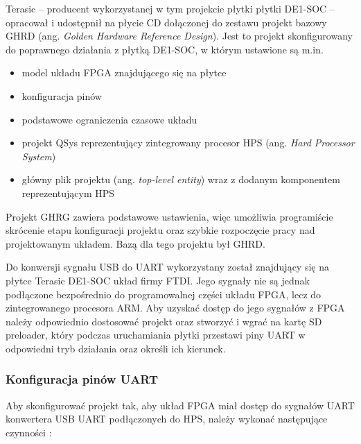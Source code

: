 Terasic -- producent wykorzystanej w tym projekcie płytki płytki DE1-SOC -- opracował i udostępnił na płycie CD dołączonej do zestawu \cite{??} projekt bazowy GHRD (ang. \textit{Golden Hardware Reference Design}). Jest to projekt skonfigurowany do poprawnego działania z płytką DE1-SOC, w którym ustawione są m.in.
\begin{itemize}[noitemsep]
\item model układu FPGA znajdującego się na płytce
\item konfiguracja pinów
\item podstawowe ograniczenia czasowe układu
\item projekt QSys reprezentujący zintegrowany procesor HPS (ang. \textit{Hard Processor System})
\item główny plik projektu (ang. \textit{top-level entity}) wraz z dodanym komponentem reprezentującym HPS
\end{itemize}
Projekt GHRG zawiera podstawowe ustawienia, więc umożliwia programiście skrócenie etapu konfiguracji projektu oraz szybkie rozpoczęcie pracy nad projektowanym układem. Bazą dla tego projektu był GHRD.

Do konwersji sygnału USB do UART wykorzystany został znajdujący się na płytce Terasic DE1-SOC układ firmy FTDI. Jego sygnały nie są jednak podłączone bezpośrednio do programowalnej części układu FPGA, lecz do zintegrowanego procesora ARM. Aby uzyskać dostęp do jego sygnałów z FPGA należy odpowiednio dostosować projekt oraz stworzyć i wgrać na kartę SD preloader, który podczas uruchamiania płytki przestawi piny UART w odpowiedni tryb działania oraz określi ich kierunek.

\subsubsection{Konfiguracja pinów UART}
\label{sec:uart-qsys}
Aby skonfigurować projekt tak, aby układ FPGA miał dostęp do sygnałów UART konwertera USB UART podłączonych do HPS, należy wykonać następujące czynności \cite{altera-youtube-loanerio, altera-forum-fgga-hps-access, altera-forum-cant-rx}:


